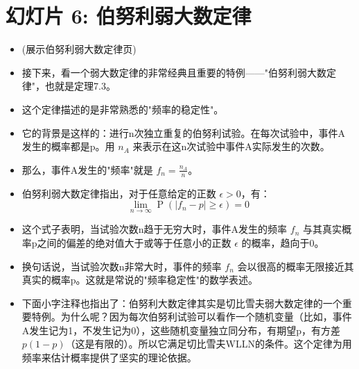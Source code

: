 \documentclass[UTF8]{article} %
\DeclareMathOperator{\Prob}{\operatorname{P}}
\begin{document}
\section*{幻灯片 6: 伯努利弱大数定律}
\begin{itemize}
    \itemsep1em
    \item (展示伯努利弱大数定律页)
    \item 接下来，看一个弱大数定律的非常经典且重要的特例——"伯努利弱大数定律"，也就是定理7.3。
    \item 这个定律描述的是非常熟悉的"频率的稳定性"。
    \item 它的背景是这样的：进行n次独立重复的伯努利试验。在每次试验中，事件A发生的概率都是p。用 $n_A$ 来表示在这n次试验中事件A实际发生的次数。
    \item 那么，事件A发生的"频率"就是 $f_n = \frac{n_A}{n}$。
    \item 伯努利弱大数定律指出，对于任意给定的正数 $\epsilon > 0$，有：
    \[ \lim_{n \to \infty} \Prob\left(\left| f_n - p \right| \geq \epsilon\right) = 0 \]
    \item 这个式子表明，当试验次数n趋于无穷大时，事件A发生的频率 $f_n$ 与其真实概率p之间的偏差的绝对值大于或等于任意小的正数 $\epsilon$ 的概率，趋向于0。
    \item 换句话说，当试验次数n非常大时，事件的频率 $f_n$ 会以很高的概率无限接近其真实的概率p。这就是常说的"频率稳定性"的数学表述。
    \item 下面小字注释也指出了：伯努利大数定律其实是切比雪夫弱大数定律的一个重要特例。为什么呢？因为每次伯努利试验可以看作一个随机变量（比如，事件A发生记为1，不发生记为0），这些随机变量独立同分布，有期望p，有方差 $p(1-p)$（这是有限的）。所以它满足切比雪夫WLLN的条件。这个定律为用频率来估计概率提供了坚实的理论依据。
\end{itemize}
\end{document}
